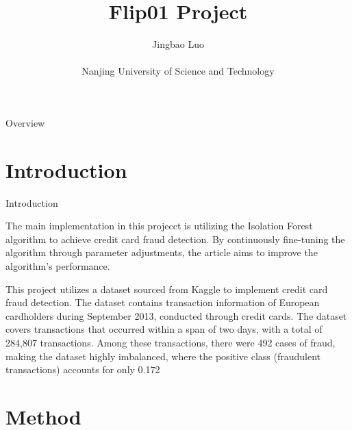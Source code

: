 \documentclass[
 size=14pt,
 paper=smartboard,  %
 mode=present, 		%
 display=slides, 	%
 style=tuliplab,  	%
 pauseslide,
 fleqn,leqno]{powerdot}
\title{Flip01 Project}
\author{
Jingbao Luo
\\
\\Nanjing University of Science and Technology
}
\date{\gitCommitterDate}
\begin{document}
\maketitle



\begin{slide}[toc=,bm=]{Overview}
\tableofcontents[content=currentsection,type=1]
\end{slide}


\section{Introduction}


\begin{slide}{Introduction}

\begin{justify}
\setlength{\parindent}{2em}
The main implementation in this projecct is utilizing the Isolation Forest algorithm to achieve credit card fraud detection. By continuously fine-tuning the algorithm through parameter adjustments, the article aims to improve the algorithm's performance.
\end{justify}


\begin{justify}
\setlength{\parindent}{2em}
This project utilizes a dataset sourced from Kaggle to implement credit card fraud detection. The dataset contains transaction information of European cardholders during September 2013, conducted through credit cards. The dataset covers transactions that occurred within a span of two days, with a total of 284,807 transactions. Among these transactions, there were 492 cases of fraud, making the dataset highly imbalanced, where the positive class (fraudulent transactions) accounts for only 0.172%
\end{justify}

\end{slide}


\section{Method}
\end{document}
